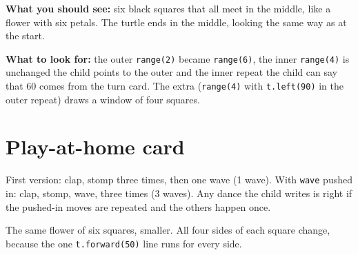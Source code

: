 \begin{answer}
\textbf{What you should see:} six black squares that all meet in the middle, like a flower with six petals. The turtle ends in the middle, looking the same way as at the start.

\textbf{What to look for:} \tickbox{} the outer \texttt{range(2)} became \texttt{range(6)}, the inner \texttt{range(4)} is unchanged \quad \tickbox{} the child points to the outer and the inner repeat \quad \tickbox{} the child can say that 60 comes from the turn card. The extra (\texttt{range(4)} with \texttt{t.left(90)} in the outer repeat) draws a window of four squares.
\end{answer}

\section{Play-at-home card}
\begin{answer}
First version: clap, stomp three times, then one wave (1 wave). With \texttt{wave} pushed in: clap, stomp, wave, three times (3 waves). Any dance the child writes is right if the pushed-in moves are repeated and the others happen once.
\end{answer}

\begin{answer}
The same flower of six squares, smaller. All four sides of each square change, because the one \texttt{t.forward(50)} line runs for every side.
\end{answer}
